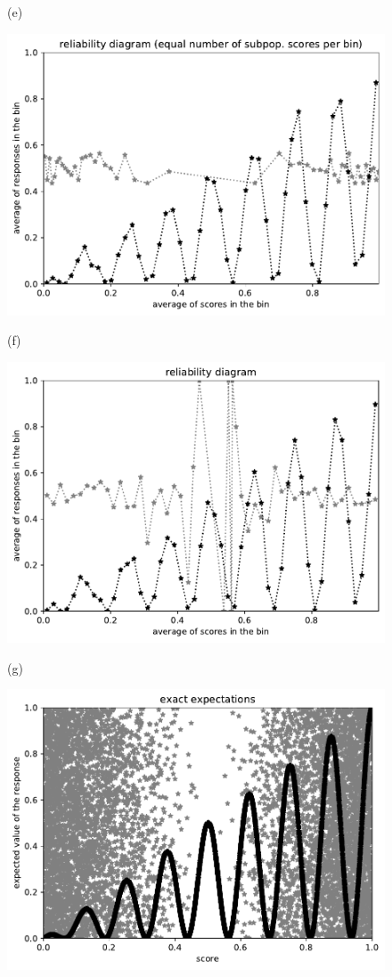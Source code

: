 \documentclass{article}
\newlength{\vertsep}
\newlength{\imsize}
\begin{document}
\begin{figure}
\begin{centering}
(e)
\parbox{\imsize}{\includegraphics[width=\imsize]
{../codes/unweighted/10000_7000_50_2/equisamps.pdf}}
\quad\quad
(f)
\parbox{\imsize}{\includegraphics[width=\imsize]
{../codes/unweighted/10000_7000_50_2/equiscore.pdf}}

\vspace{\vertsep}

(g)
\parbox{\imsize}{\includegraphics[width=\imsize]
{../codes/unweighted/10000_7000_10_2/exact.pdf}}


\end{centering}
\end{figure}
\end{document}
